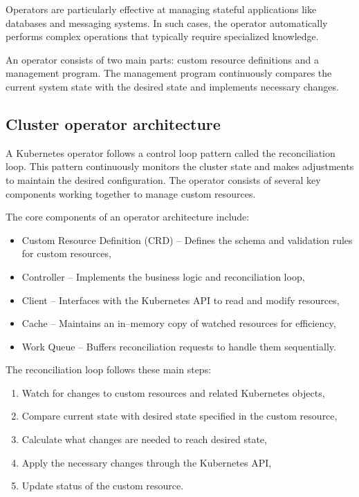 Operators are particularly effective at managing stateful applications like databases and messaging systems.
In such cases, the operator automatically performs complex operations that typically require specialized knowledge.

An operator consists of two main parts: custom resource definitions and a management program.
The management program continuously compares the current system state with the desired state and implements necessary changes.

\subsection{Cluster operator architecture}

A Kubernetes operator follows a control loop pattern called the reconciliation loop.
This pattern continuously monitors the cluster state and makes adjustments to maintain the desired configuration.
The operator consists of several key components working together to manage custom resources.

The core components of an operator architecture include:

\begin{itemize}
    \item Custom Resource Definition (CRD) -- Defines the schema and validation rules for custom resources,
    \item Controller -- Implements the business logic and reconciliation loop,
    \item Client -- Interfaces with the Kubernetes API to read and modify resources,
    \item Cache -- Maintains an in--memory copy of watched resources for efficiency,
    \item Work Queue -- Buffers reconciliation requests to handle them sequentially.
\end{itemize}

The reconciliation loop follows these main steps:
\begin{enumerate}
    \item Watch for changes to custom resources and related Kubernetes objects,
    \item Compare current state with desired state specified in the custom resource,
    \item Calculate what changes are needed to reach desired state,
    \item Apply the necessary changes through the Kubernetes API,
    \item Update status of the custom resource.
\end{enumerate}

